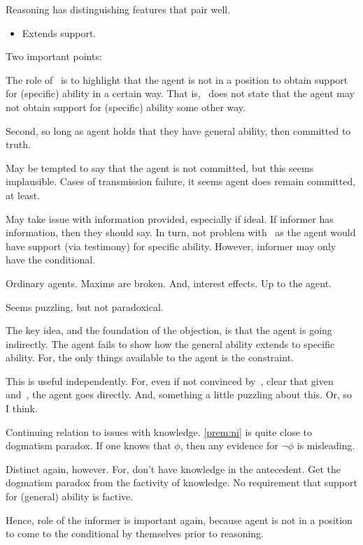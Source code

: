 \hozline{}

\begin{note}
  Reasoning has distinguishing features that pair well.
  \begin{itemize}
  \item Extends support.
  \end{itemize}
\end{note}


\begin{note}
  Two important points:

  The role of~\nI{} is to highlight that the agent is not in a position to obtain support for (specific) ability in a certain way.
  That is,~\nI{} does not state that the agent may not obtain support for (specific) ability some other way.

  Second, so long as agent holds that they have general ability, then committed to truth.

  May be tempted to say that the agent is not committed, but this seems implausible.
  Cases of transmission failure, it seems agent does remain committed, at least.

  May take issue with information provided, especially if ideal.
  If informer has information, then they should say.
  In turn, not problem with~\nI{} as the agent would have support (via testimony) for specific ability.
  However, informer may only have the conditional.

  Ordinary agents.
  Maxims are broken.
  And, interest effects.
  Up to the agent.

  Seems puzzling, but not paradoxical.
\end{note}

\begin{note}
  The key idea, and the foundation of the objection, is that the agent is going indirectly.
  The agent fails to show how the general ability extends to specific ability.
  For, the only things available to the agent is the constraint.

  This is useful independently.
  For, even if not convinced by~\nI{}, clear that given \gsi{} and~\ESU{}, the agent goes directly.
  And, something a little puzzling about this.
  Or, so I think.
\end{note}

\begin{note}[Dogmatism]
  Continuing relation to issues with knowledge.
  \autoref{prem:ni} is quite close to dogmatism paradox.
  If one knows that \(\phi\), then any evidence for \(\lnot \phi\) is misleading.

  Distinct again, however.
  For, don't have knowledge in the antecedent.
  Get the dogmatism paradox from the factivity of knowledge.
  No requirement that support for (general) ability is factive.

  Hence, role of the informer is important again, because agent is not in a position to come to the conditional by themselves prior to reasoning.
\end{note}

